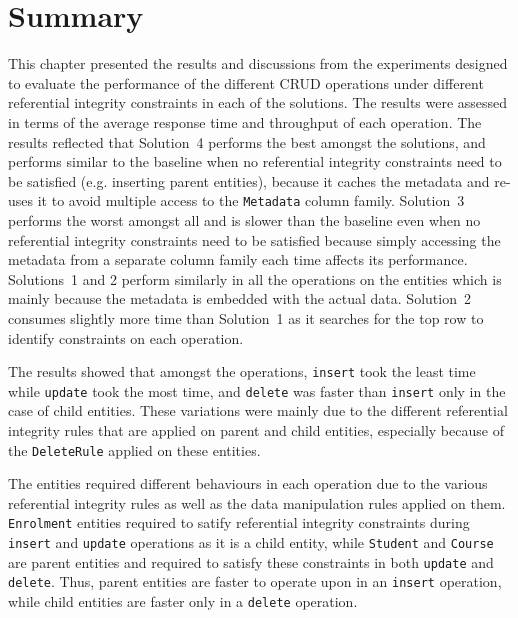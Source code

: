 \section{Summary} \label{s:results-summary}

This chapter presented the results and discussions from the experiments designed
to evaluate the performance of the different \ac{CRUD} operations under
different referential integrity constraints in each of the solutions.
The results were assessed in terms of the average response time and throughput
of each operation. The results reflected that Solution~4 performs the best
amongst the solutions, and performs similar to the baseline when no referential
integrity constraints need to be satisfied (e.g. inserting parent entities),
because it caches the metadata and re-uses it to avoid multiple access to the
\texttt{Metadata} column family.
Solution~3 performs the worst amongst all and is slower than the baseline even
when no referential integrity constraints need to be satisfied because
simply accessing the metadata from a separate column family each time affects
its performance.
Solutions~1 and 2 perform similarly in all the operations on the entities which
is mainly because the metadata is embedded with the actual data.   Solution~2
consumes slightly more time than Solution~1 as it searches for the top row to
identify constraints on each operation.

The results showed that amongst the operations,   \texttt{insert} took the least
time while \texttt{update} took the most time,   and \texttt{delete} was faster
than \texttt{insert} only in the case of child entities.   These variations were
mainly due to the different referential integrity rules that are applied on
parent and child entities,   especially because of the \texttt{DeleteRule}
applied on these entities.  

The entities required different behaviours in each operation due to the various
referential integrity rules as well as  the data manipulation rules applied on
them.
\texttt{Enrolment} entities required to satify referential integrity constraints
during \texttt{insert} and \texttt{update} operations as it is a child entity,
while \texttt{Student} and \texttt{Course} are parent entities and required to
satisfy these constraints in both \texttt{update} and \texttt{delete}.   Thus,
parent entities are faster to operate upon in an \texttt{insert} operation,  
while child entities are faster only in a \texttt{delete} operation.
	
